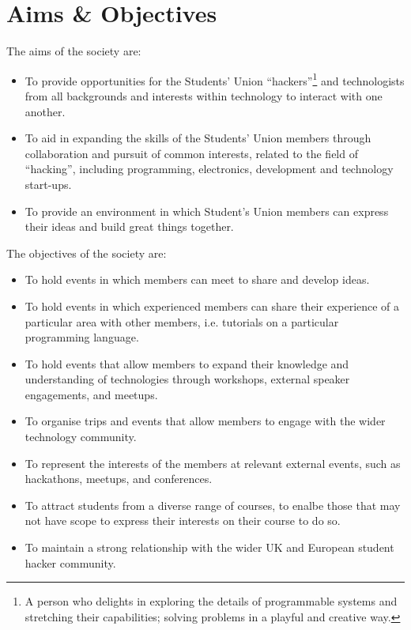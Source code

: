 \section*{Aims \& Objectives}
\begin{clause}
The aims of the society are:
	\begin{itemize}
		\item To provide opportunities for the Students' Union ``hackers''\footnote{A person who delights in exploring the details of programmable systems and stretching their capabilities; solving problems in a playful and 		creative way.} and technologists from all backgrounds and interests within technology to interact with one another.
		\item To aid in expanding the skills of the Students' Union members through collaboration and pursuit of common interests, related to the field of ``hacking'', including programming, electronics, development and technology start-ups.
		\item To provide an environment in which Student's Union members can express their ideas and build great things together.
	\end{itemize}
\end{clause}
\begin{clause}
The objectives of the society are:
	\begin{itemize}
		\item To hold events in which members can meet to share and develop ideas.
		\item To hold events in which experienced members can share their experience of a particular area with other members, i.e. tutorials on a particular programming language.
		\item To hold events that allow members to expand their knowledge and understanding of technologies through workshops, external speaker engagements, and meetups.
		\item To organise trips and events that allow members to engage with the wider technology community.
		\item To represent the interests of the members at relevant external events, such as hackathons, meetups, and conferences.
		\item To attract students from a diverse range of courses, to enalbe those that may not have scope to express their interests on their course to do so.
		\item To maintain a strong relationship with the wider UK and European student hacker community.
	\end{itemize}
\end{clause}

